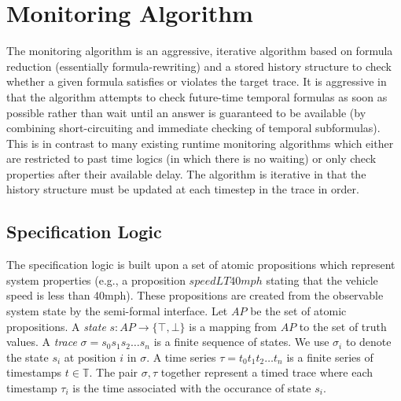 
\section{Monitoring Algorithm}
The monitoring algorithm is an aggressive, iterative algorithm based on formula reduction (essentially formula-rewriting) and a stored history structure to check whether a given formula satisfies or violates the target trace. 
It is aggressive in that the algorithm attempts to check future-time temporal formulas as soon as possible rather than wait until an answer is guaranteed to be available (by combining short-circuiting and immediate checking of temporal subformulas).
This is in contrast to many existing runtime monitoring algorithms which either are restricted to past time logics (in which there is no waiting) or only check properties after their available delay. %
The algorithm is iterative in that the history structure must be updated at each timestep in the trace in order. 

\subsection{Specification Logic}
The specification logic is built upon a set of atomic propositions which represent system properties (e.g., a proposition $speedLT40mph$ stating that the vehicle speed is less than 40mph). These propositions are created from the observable system state by the semi-formal interface.
Let $AP$ be the set of atomic propositions. 
A \emph{state} $s: AP \rightarrow \{\top,\bot\}$ is a mapping from $AP$ to the set of truth values. A \emph{trace} $\sigma = s_0s_1s_2\ldots{}s_n$ is a finite sequence of states. We use $\sigma_i$ to denote the state $s_i$ at position $i$ in $\sigma$.
%
A time series $\tau = t_0t_1t_2\ldots{}t_n$ is a finite series of timestamps $t\in\mathbb{T}$. The pair $\sigma, \tau$ together represent a timed trace where each timestamp $\tau_i$ is the time associated with the occurance of state $s_i$.
%

